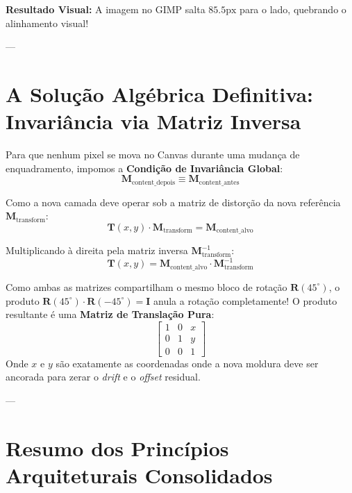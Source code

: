 \documentclass[12pt,a4paper]{article}
\begin{document}
\textbf{Resultado Visual:} A imagem no GIMP salta $85.5\text{px}$ para o lado, quebrando o alinhamento visual!

---

\section{A Solução Algébrica Definitiva: Invariância via Matriz Inversa}

Para que nenhum pixel se mova no Canvas durante uma mudança de enquadramento, impomos a \textbf{Condição de Invariância Global}:
\begin{equation}
\mathbf{M}_{\text{content\_depois}} \equiv \mathbf{M}_{\text{content\_antes}}
\end{equation}

Como a nova camada deve operar sob a matriz de distorção da nova referência $\mathbf{M}_{\text{transform}}$:
\begin{equation}
\mathbf{T}(x, y) \cdot \mathbf{M}_{\text{transform}} = \mathbf{M}_{\text{content\_alvo}}
\end{equation}

Multiplicando à direita pela matriz inversa $\mathbf{M}_{\text{transform}}^{-1}$:
\begin{equation}
\mathbf{T}(x, y) = \mathbf{M}_{\text{content\_alvo}} \cdot \mathbf{M}_{\text{transform}}^{-1}
\end{equation}

\begin{tcolorbox}[title=Propriedade Fundamental da Inversão Afim]
Como ambas as matrizes compartilham o mesmo bloco de rotação $\mathbf{R}(45^\circ)$, o produto $\mathbf{R}(45^\circ) \cdot \mathbf{R}(-45^\circ) = \mathbf{I}$ anula a rotação completamente!
O produto resultante é uma \textbf{Matriz de Translação Pura}:
\begin{equation}
\begin{bmatrix} 1 & 0 & x \\ 0 & 1 & y \\ 0 & 0 & 1 \end{bmatrix}
\end{equation}
Onde $x$ e $y$ são exatamente as coordenadas onde a nova moldura deve ser ancorada para zerar o \textit{drift} e o \textit{offset} residual.
\end{tcolorbox}

---

\section{Resumo dos Princípios Arquiteturais Consolidados}
\end{document}
